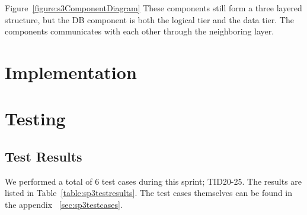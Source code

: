 Figure~\ref{figure:s3ComponentDiagram} These components still form a three layered structure, but the DB component is both the logical tier and the data tier. The components communicates with each other through the neighboring layer.


\section{Implementation}

\section{Testing}
\subsection{Test Results}
We performed a total of 6 test cases during this sprint; TID20-25. The results are listed in Table~\ref{table:sp3testresults}. The test cases themselves can be found in the appendix ~\ref{sec:sp3testcases}.

